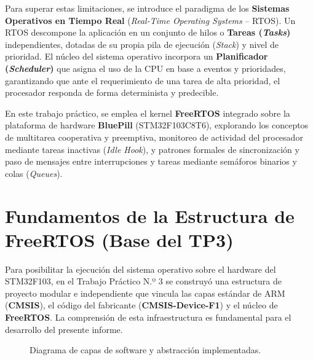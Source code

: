 \documentclass{plantilla}
\begin{document}
Para superar estas limitaciones, se introduce el paradigma de los \textbf{Sistemas Operativos en Tiempo Real} (\textit{Real-Time Operating Systems} -- RTOS). Un RTOS descompone la aplicación en un conjunto de hilos o \textbf{Tareas (\textit{Tasks})} independientes, dotadas de su propia pila de ejecución (\textit{Stack}) y nivel de prioridad. El núcleo del sistema operativo incorpora un \textbf{Planificador (\textit{Scheduler})} que asigna el uso de la CPU en base a eventos y prioridades, garantizando que ante el requerimiento de una tarea de alta prioridad, el procesador responda de forma determinista y predecible.

En este trabajo práctico, se emplea el kernel \textbf{FreeRTOS} integrado sobre la plataforma de hardware \textbf{BluePill} (STM32F103C8T6), explorando los conceptos de multitarea cooperativa y preemptiva, monitoreo de actividad del procesador mediante tareas inactivas (\textit{Idle Hook}), y patrones formales de sincronización y paso de mensajes entre interrupciones y tareas mediante semáforos binarios y colas (\textit{Queues}).

\section{Fundamentos de la Estructura de FreeRTOS (Base del TP3)}
Para posibilitar la ejecución del sistema operativo sobre el hardware del STM32F103, en el Trabajo Práctico N.º 3 se construyó una estructura de proyecto modular e independiente que vincula las capas estándar de ARM (\textbf{CMSIS}), el código del fabricante (\textbf{CMSIS-Device-F1}) y el núcleo de \textbf{FreeRTOS}. La comprensión de esta infraestructura es fundamental para el desarrollo del presente informe.

\begin{figure}[H]
\centering
{}
\caption{Diagrama de capas de software y abstracción implementadas.}
\label{fig_capas}
\end{figure}
\end{document}

